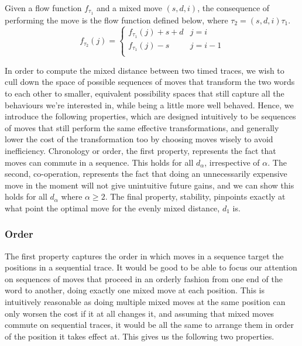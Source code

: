 \documentclass[runningheads]{llncs}
\newcounter{cases}
\begin{document}
	\begin{lemma}\label{FlowFuncTrans}
		Given a flow function $f_{\tau_1}$ and a mixed move $(s, d, i)$, the consequence of performing the move is the flow function defined below, where $\tau_2 = (s, d, i)\tau_1$. 
		$$f_{\tau_2}(j) = \begin{cases} 
			f_{\tau_1}(j) + s + d & j = i\\
			f_{\tau_1}(j) - s  & j = i-1\\
		\end{cases}
		$$
		
	\end{lemma}
	
	
	In order to compute the mixed distance between two timed traces, we wish to cull down the space of possible sequences of moves that transform the two words to each other to smaller, equivalent possibility spaces that still capture all the behaviours we're interested in, while being a little more well behaved. 
	Hence, we introduce the following properties, which are designed intuitively to be sequences of moves that still perform the same effective transformations, and generally lower the cost of the transformation too by choosing moves wisely to avoid inefficiency. 
	Chronology or order, the first property, represents the fact that moves can commute in a sequence. This holds for all $d_\alpha$, irrespective of $\alpha$. 
	The second, co-operation, represents the fact that doing an unnecessarily expensive move in the moment will not give unintuitive future gains, and we can show this holds for all $d_{\alpha}$ where $\alpha \geq 2$. 
	The final property, stability, pinpoints exactly at what point the optimal move for the evenly mixed distance, $d_1$ is. 
	
	\subsubsection{Order}
	The first property captures the order in which moves in a sequence target the positions in a sequential trace. 
	It would be good to be able to focus our attention on sequences of moves that proceed in an orderly fashion from one end of the word to another, doing exactly one mixed move at each position. This is intuitively reasonable as doing multiple mixed moves at the same position can only worsen the cost if it at all changes it, and assuming that mixed moves commute on sequential traces, it would be all the same to arrange them in order of the position it takes effect at. This gives us the following two properties. 
	
\end{document}
